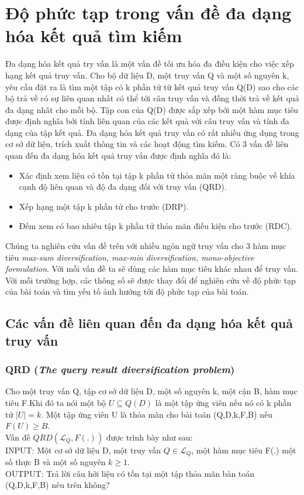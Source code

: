 \documentclass[12pt]{report}
\begin{document}
\section{Độ phức tạp trong vấn đề đa dạng hóa kết quả tìm kiếm}
\cite{main-paper}
Đa dạng hóa kết quả try vấn là một vấn đề tối ưu hóa đa điều kiện cho việc xếp hạng kết quả truy  vấn. 
Cho bộ dữ liệu D, một truy vấn Q và một số nguyên k, yêu cầu đặt ra là tìm một tập có k phần tử từ kết quả truy vấn Q(D) sao cho các bộ trả về có sự liên quan nhất có thể tới câu truy vấn và đồng thời trả về kết quả đa dạng nhất cho mỗi bộ. Tập con của Q(D) được sắp xếp bởi một hàm mục tiêu được định nghĩa bởi tính liên quan của các kết quả với câu truy vấn và tính đa dạng của tập kết quả. Đa dạng hóa kết quả truy vấn có rất nhiều ứng dụng trong cơ sở dữ liệu, trích xuất thông tin và các hoạt động tìm kiếm. 
Có 3 vấn đề liên quan đến đa dạng hóa kết quả truy vấn được định nghĩa đó là:
  \begin{itemize}
  \item Xác định xem liệu có tồn tại tập k phần tử thỏa mãn một ràng buộc về khía cạnh độ liên quan và độ đa dạng đối với truy vấn (QRD).
  \item Xếp hạng một tập k phần tử cho trước (DRP).
  \item Đếm xem có bao nhiêu tập k phần tử thỏa mãn điều kiện cho trước (RDC).
  \end{itemize}
Chúng ta nghiên cứu vấn đề trên với nhiều ngôn ngữ truy vấn cho 3 hàm mục tiêu \textit{max-sum diversification, max-min diversification, mono-objective formulation}.
Với mỗi vấn đề ta sẽ dùng các hàm mục tiêu khác nhau để truy vấn. Với mỗi trường hợp, các thông số sẽ được thay đổi để nghiên cứu về độ phức tạp của bài toán và tìm yếu tố ảnh hưởng tới độ phức tạp của bài toán. 
\subsection{Các vấn đề liên quan đến đa dạng hóa kết quả truy vấn}
	\subsubsection{QRD  (\textit{The query result diversification problem}) }
	Cho một truy vấn Q, tập cơ sở dữ liệu D, một số nguyên k, một cận B, hàm mục tiêu F.Khi đó ta nói một bộ $ U \subseteq Q(D) $ là một tập ứng viên nếu nó có k phần tử $|U| = k$. Một tập ứng viên U là thỏa mãn cho bài toán (Q,D,k,F,B) nếu $F(U) \ge B$.\\
	Vấn đề $QRD(\mathcal{L}_Q,F(.))$ được trình bày như sau: \\
	INPUT: 	Một cơ sở dữ liệu D, một truy vấn $Q\in \mathcal{L}_Q$, một hàm mục tiêu F(.) một số thực B và một số nguyên $k\ge1$.\\
	OUTPUT: Trả lời câu hởi liệu có tồn tại một tập thỏa mãn bàn toán (Q,D,k,F,B) nêu trên không?
\end{document}
